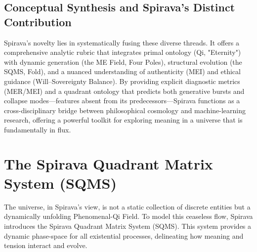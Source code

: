 \documentclass[11pt, a4paper]{article}
\begin{document}
\subsection{Conceptual Synthesis and Spirava's Distinct Contribution}
Spirava’s novelty lies in systematically fusing these diverse threads. It offers a comprehensive analytic rubric that integrates primal ontology (Qi, "Eternity") with dynamic generation (the ME Field, Four Poles), structural evolution (the SQMS, Fold), and a nuanced understanding of authenticity (MEI) and ethical guidance (Will–Sovereignty Balance). By providing explicit diagnostic metrics (MER/MEI) and a quadrant ontology that predicts both generative bursts and collapse modes—features absent from its predecessors—Spirava functions as a cross-disciplinary bridge between philosophical cosmology and machine-learning research, offering a powerful toolkit for exploring meaning in a universe that is fundamentally in flux.


\section{The Spirava Quadrant Matrix System (SQMS)}
The universe, in Spirava’s view, is not a static collection of discrete entities but a dynamically unfolding Phenomenal-Qi Field. To model this ceaseless flow, Spirava introduces the Spirava Quadrant Matrix System (SQMS). This system provides a dynamic phase-space for all existential processes, delineating how meaning and tension interact and evolve.
\end{document}
